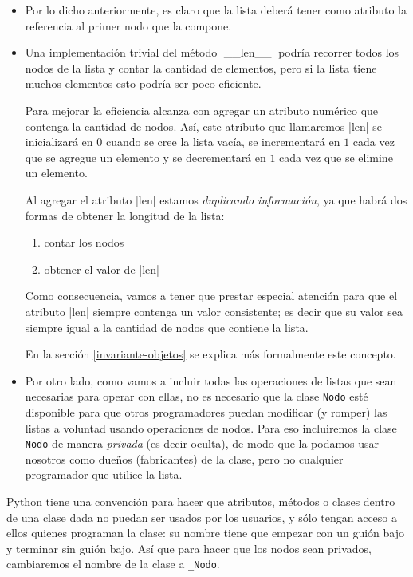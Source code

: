 \begin{itemize}

\item Por lo dicho anteriormente, es claro que la lista deberá tener como
atributo la referencia al primer nodo que la compone.

\item Una implementación trivial del método |__len__| podría
recorrer todos los nodos de la lista y contar la cantidad de elementos,
pero si la lista tiene muchos elementos esto podría ser poco eficiente.

Para mejorar la eficiencia alcanza con agregar un atributo numérico que
contenga la cantidad de nodos. Así, este atributo que llamaremos |len|
se inicializará en $0$ cuando se cree la lista vacía, se
incrementará en $1$ cada vez que se agregue un elemento y se decrementará en $1$
cada vez que se elimine un elemento.

\begin{atencion}
Al agregar el atributo |len| estamos {\it duplicando información}, ya que habrá
dos formas de obtener la longitud de la lista:

\begin{enumerate}
\item contar los nodos
\item obtener el valor de |len|
\end{enumerate}

Como consecuencia, vamos a tener que prestar especial atención para que el
atributo |len| siempre contenga un valor consistente; es decir que su valor sea
siempre igual a la cantidad de nodos que contiene la lista.

En la sección \ref{invariante-objetos} se explica más formalmente este
concepto.
\end{atencion}

\item Por otro lado, como vamos a incluir todas las operaciones de listas
que sean necesarias para operar con ellas, no es necesario que la clase
\lstinline!Nodo! esté disponible para que otros programadores puedan
modificar (y romper) las listas a voluntad usando operaciones de nodos. Para eso
incluiremos la clase \lstinline!Nodo! de manera {\it privada} (es
decir oculta), de modo que la podamos usar nosotros como dueños
(fabricantes) de la clase, pero no cualquier programador que utilice la
lista.
\end{itemize}

Python tiene una convención para hacer que atributos, métodos o clases
dentro de una clase dada no puedan ser usados por los usuarios, y sólo
tengan acceso a ellos quienes programan la clase: su nombre tiene que
empezar con un guión bajo y terminar sin guión bajo. Así que para hacer que
los nodos sean privados, cambiaremos el nombre de la clase a \lstinline|_Nodo|.

